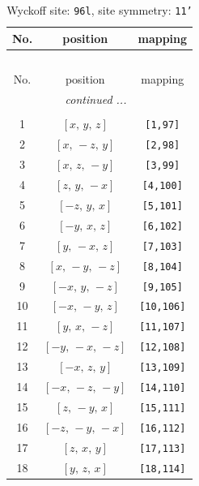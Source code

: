 \documentclass[fleqn,8pt]{jsarticle}
\begin{document}
\begin{longtable}{ccc}
\caption{Wyckoff site: {\tt 96l}, site symmetry: {\tt 11'}}
 \\
 \hline \hline
No. & position & mapping \\ \hline \endfirsthead

\multicolumn{2}{l}{\tablename\ \thetable{}} \\
 \hline \hline
No. & position & mapping \\ \hline \endhead

 \hline \hline
\multicolumn{2}{r}{\footnotesize\it continued ...} \\ \endfoot

 \hline \hline
\multicolumn{2}{r}{} \\ \endlastfoot

1 & $\left[ x,\, y,\, z \right]$ & {\tt [1,97]} \\ \hline
2 & $\left[ x,\, - z,\, y \right]$ & {\tt [2,98]} \\ \hline
3 & $\left[ x,\, z,\, - y \right]$ & {\tt [3,99]} \\ \hline
4 & $\left[ z,\, y,\, - x \right]$ & {\tt [4,100]} \\ \hline
5 & $\left[ - z,\, y,\, x \right]$ & {\tt [5,101]} \\ \hline
6 & $\left[ - y,\, x,\, z \right]$ & {\tt [6,102]} \\ \hline
7 & $\left[ y,\, - x,\, z \right]$ & {\tt [7,103]} \\ \hline
8 & $\left[ x,\, - y,\, - z \right]$ & {\tt [8,104]} \\ \hline
9 & $\left[ - x,\, y,\, - z \right]$ & {\tt [9,105]} \\ \hline
10 & $\left[ - x,\, - y,\, z \right]$ & {\tt [10,106]} \\ \hline
11 & $\left[ y,\, x,\, - z \right]$ & {\tt [11,107]} \\ \hline
12 & $\left[ - y,\, - x,\, - z \right]$ & {\tt [12,108]} \\ \hline
13 & $\left[ - x,\, z,\, y \right]$ & {\tt [13,109]} \\ \hline
14 & $\left[ - x,\, - z,\, - y \right]$ & {\tt [14,110]} \\ \hline
15 & $\left[ z,\, - y,\, x \right]$ & {\tt [15,111]} \\ \hline
16 & $\left[ - z,\, - y,\, - x \right]$ & {\tt [16,112]} \\ \hline
17 & $\left[ z,\, x,\, y \right]$ & {\tt [17,113]} \\ \hline
18 & $\left[ y,\, z,\, x \right]$ & {\tt [18,114]} \\ \hline

\end{longtable}
\end{document}
